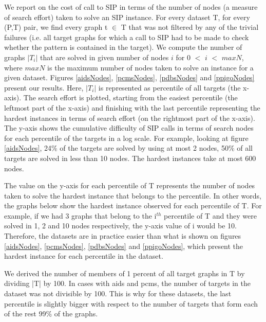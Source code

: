 \documentclass{l4proj}
\newcounter{example}[section]
\begin{document}

We report on the cost of call to SIP in terms of the number of nodes (a measure of search effort) taken to solve an SIP instance. For every dataset T, for every (P,T) pair, we find every graph t $\in$ T that was not filtered by any of the trivial failures (i.e. all target graphs for which a call to SIP had to be made to check whether the pattern is contained in the target). We compute the number of graphs $|T_i|$ that are solved in given number of nodes $i$ for $0$ $<$ $i$ $<$ $maxN$, where $maxN$ is the maximum number of nodes taken to solve an instance for a given dataset. Figures \ref{aidsNodes}, \ref{pcmsNodes}, \ref{pdbsNodes} and \ref{ppigoNodes} present our results. Here, $|T_i|$ is represented as percentile of all targets (the x-axis). The search effort is plotted, starting from the easiest percentile (the leftmost part of the x-axis) and finishing with the last percentile representing the hardest instances in terms of search effort (on the rightmost part of the x-axis). The y-axis shows the cumulative difficulty of SIP calls in terms of search nodes for each percentile of the targets in a log scale. For example, looking at figure \ref{aidsNodes}, 24\% of the targets are solved by using at most 2 nodes, 50\% of all targets are solved in less than 10 nodes. The hardest instances take at most 600 nodes.

The value on the y-axis for each percentile of T represents the number of nodes taken to solve the hardest instance that belongs to the percentile. In other words, the graphs below show the hardest instance observed for each percentile of T. For example, if we had 3 graphs that belong to the i$^{th}$ percentile of T and they were solved in 1, 2 and 10 nodes respectively, the y-axis value of i would be 10. Therefore, the datasets are in practice easier than what is shown on figures \ref{aidsNodes}, \ref{pcmsNodes}, \ref{pdbsNodes} and \ref{ppigoNodes}, which present the hardest instance for each percentile in the dataset.

We derived the number of members of 1 percent of all target graphs in T by dividing |T| by 100. In cases with aids and pcms, the number of targets in the dataset was not divisible by 100. This is why for these datasets, the last percentile is slightly bigger with respect to the number of targets that form each of the rest 99\% of the graphs.
\end{document}
